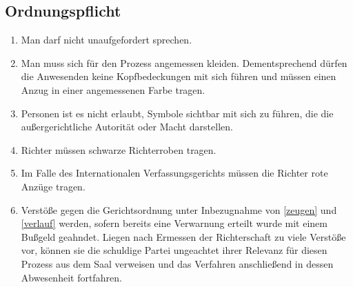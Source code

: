 \documentclass{article}
\begin{document}
\subsection{Ordnungspflicht}\label{gordnung}
\begin{enumerate}[(1)]
    \item Man darf nicht unaufgefordert sprechen.
    \item Man muss sich für den Prozess angemessen kleiden. Dementsprechend dürfen die Anwesenden keine Kopfbedeckungen mit sich führen und müssen einen Anzug in einer angemessenen Farbe tragen.
    \item Personen ist es nicht erlaubt, Symbole sichtbar mit sich zu führen, die die außergerichtliche Autorität oder Macht darstellen.
    \item Richter müssen schwarze Richterroben tragen.
    \item Im Falle des Internationalen Verfassungsgerichts müssen die Richter rote Anzüge tragen.
    \item Verstöße gegen die Gerichtsordnung unter Inbezugnahme von \ref{zeugen} und \ref{verlauf} werden, sofern bereits eine Verwarnung erteilt wurde mit einem Bußgeld geahndet. Liegen nach Ermessen der Richterschaft zu viele Verstöße vor, können sie die schuldige Partei ungeachtet ihrer Relevanz für diesen Prozess aus dem Saal verweisen und das Verfahren anschließend in dessen Abwesenheit fortfahren.
\end{enumerate}
\end{document}

